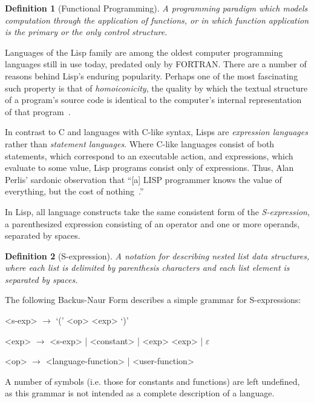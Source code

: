 \documentclass[11pt,a4paper]{article}
\theoremstyle{break}
\newtheorem{defn}{Definition}
\begin{document}
\begin{defn}[Functional Programming]
A programming paradigm which models computation through the application of functions, or in which function application is the primary or the only control structure.
\end{defn}

Languages of the Lisp family are among the oldest computer programming languages still in use today, predated only by FORTRAN. There are a number of reasons behind Lisp's enduring popularity. Perhaps one of the most fascinating such property is that of \textit{homoiconicity}, the quality by which the textual structure of a program's source code is identical to the computer's internal representation of that program~\cite{vanderhart2010macros,sicp}.

In contrast to C and languages with C-like syntax, Lisps are \textit{expression languages} rather than \textit{statement languages}. Where C-like languages consist of both statements, which correspond to an executable action, and expressions, which evaluate to some value, Lisp programs consist only of expressions. Thus, Alan Perlis' sardonic observation that ``[a] LISP programmer knows the value of everything, but the cost of nothing~\cite{Perlis:1982:SFE:947955.1083808}.''

In Lisp, all language constructs take the same consistent form of the \textit{S-expression}, a parenthesized expression consisting of an operator and one or more operands, separated by spaces.

\begin{defn}[S-expression]
A notation for describing nested list data structures, where each list is delimited by parenthesis characters and each list element is separated by spaces.
\end{defn}

The following Backus-Naur Form describes a simple grammar for S-expressions:
\begin{listing}[h]
    \centering
    \begin{grammar}
      <s-exp> $\to$ `(' <op> <exp> `)'

      <exp>  $\to$ <s-exp>  | <constant> | <exp> <exp> | $\varepsilon$

      <op>  $\to$ <language-function> | <user-function>
    \end{grammar}
\end{listing}

A number of symbols (i.e. those for constants and functions) are left undefined, as this grammar is not intended as a complete description of a language.
\end{document}
